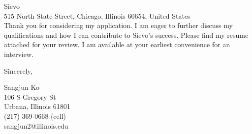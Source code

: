 \documentclass{letter}
\begin{document}
\begin{letter}{Sievo\\
515 North State Street, Chicago, Illinois 60654, United States\\
}
Thank you for considering my application. I am eager to further discuss my qualifications and how I can contribute to Sievo's success. Please find my resume attached for your review. I am available at your earliest convenience for an interview.



\closing{Sincerely,
}

Sangjun Ko\\
106 S Gregory St\\
Urbana, Illinois 61801\\
(217) 369-0668 (cell)\\sangjun2@illinois.edu
\end{letter}
\end{document}
